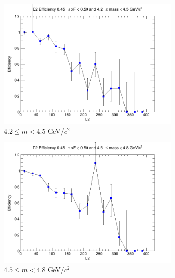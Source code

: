 \begin{figure}[p]
    \centering
    \begin{subfigure}[b]{0.32\textwidth}
        \centering
        \includegraphics[width=\textwidth]{./kTrackerEfficiencyPlots/D2_Efficiency_xF9_mass0.png}
        \caption{$4.2 \leq m < 4.5$ GeV/$c^2$}
        \label{fig:xF9_mass0}
    \end{subfigure}
    \hfill
    \begin{subfigure}[b]{0.32\textwidth}
        \centering
        \includegraphics[width=\textwidth]{./kTrackerEfficiencyPlots/D2_Efficiency_xF9_mass1.png}
        \caption{$4.5 \leq m < 4.8$ GeV/$c^2$}
        \label{fig:xF9_mass1}
    \end{subfigure}
    \hfill
    \begin{subfigure}[b]{0.32\textwidth}

\end{subfigure}
\end{figure}
